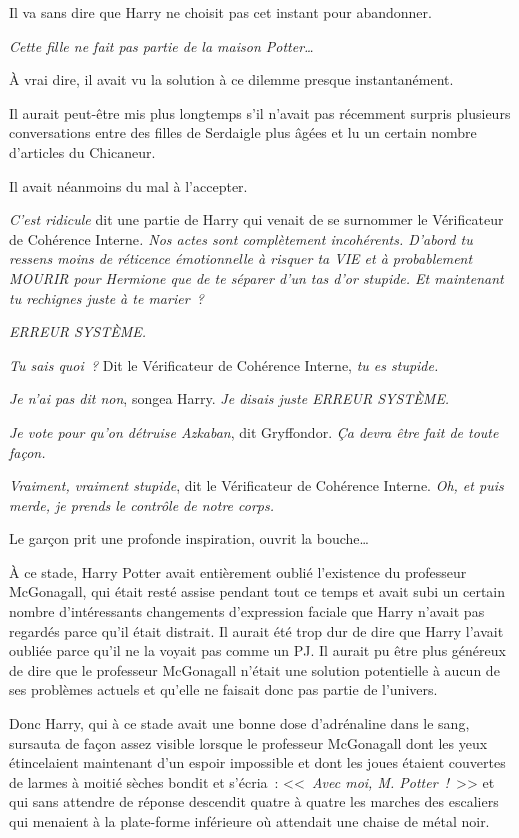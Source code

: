Il va sans dire que Harry ne choisit pas cet instant pour abandonner.

\emph{Cette fille ne fait pas partie de la maison Potter…}

À vrai dire, il avait vu la solution à ce dilemme presque instantanément.

Il aurait peut-être mis plus longtemps s'il n'avait pas récemment surpris plusieurs conversations entre des filles de Serdaigle plus âgées et lu un certain nombre d'articles du Chicaneur.

Il avait néanmoins du mal à l'accepter.

\emph{C'est ridicule} dit une partie de Harry qui venait de se surnommer le Vérificateur de Cohérence Interne\emph{. Nos actes sont complètement incohérents. D'abord tu ressens moins de réticence émotionnelle à risquer ta VIE et à probablement MOURIR pour Hermione que de te séparer d'un tas d'or stupide. Et maintenant tu rechignes juste à te marier~?}

\emph{ERREUR SYSTÈME.}

\emph{Tu sais quoi~?} Dit le Vérificateur de Cohérence Interne, \emph{tu es stupide.}

\emph{Je n'ai pas dit non}, songea Harry. \emph{Je disais juste ERREUR SYSTÈME.}

\emph{Je vote pour qu'on détruise Azkaban}, dit Gryffondor. \emph{Ça devra être fait de toute façon.}

\emph{Vraiment, vraiment stupide}, dit le Vérificateur de Cohérence Interne. \emph{Oh, et puis merde, je prends le contrôle de notre corps.}

Le garçon prit une profonde inspiration, ouvrit la bouche…

À ce stade, Harry Potter avait entièrement oublié l'existence du professeur McGonagall, qui était resté assise pendant tout ce temps et avait subi un certain nombre d'intéressants changements d'expression faciale que Harry n'avait pas regardés parce qu'il était distrait. Il aurait été trop dur de dire que Harry l'avait oubliée parce qu'il ne la voyait pas comme un PJ. Il aurait pu être plus généreux de dire que le professeur McGonagall n'était une solution potentielle à aucun de ses problèmes actuels et qu'elle ne faisait donc pas partie de l'univers.

Donc Harry, qui à ce stade avait une bonne dose d'adrénaline dans le sang, sursauta de façon assez visible lorsque le professeur McGonagall dont les yeux étincelaient maintenant d'un espoir impossible et dont les joues étaient couvertes de larmes à moitié sèches bondit et s'écria~: <<~\emph{Avec moi, M. Potter~!}~>> et qui sans attendre de réponse descendit quatre à quatre les marches des escaliers qui menaient à la plate-forme inférieure où attendait une chaise de métal noir.

